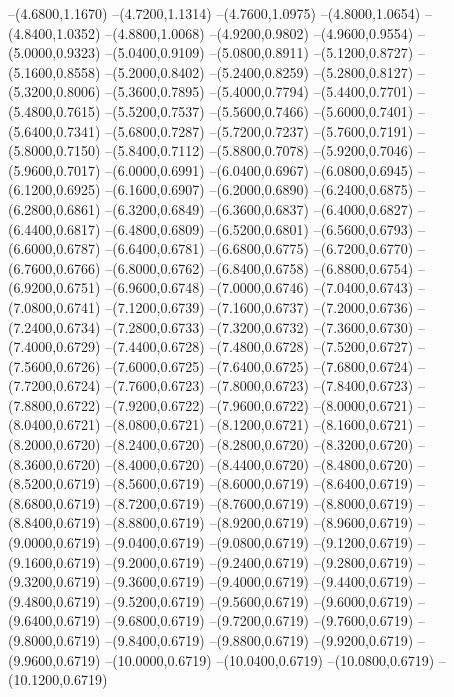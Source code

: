 {	--(4.6800,1.1670)
	--(4.7200,1.1314)
	--(4.7600,1.0975)
	--(4.8000,1.0654)
	--(4.8400,1.0352)
	--(4.8800,1.0068)
	--(4.9200,0.9802)
	--(4.9600,0.9554)
	--(5.0000,0.9323)
	--(5.0400,0.9109)
	--(5.0800,0.8911)
	--(5.1200,0.8727)
	--(5.1600,0.8558)
	--(5.2000,0.8402)
	--(5.2400,0.8259)
	--(5.2800,0.8127)
	--(5.3200,0.8006)
	--(5.3600,0.7895)
	--(5.4000,0.7794)
	--(5.4400,0.7701)
	--(5.4800,0.7615)
	--(5.5200,0.7537)
	--(5.5600,0.7466)
	--(5.6000,0.7401)
	--(5.6400,0.7341)
	--(5.6800,0.7287)
	--(5.7200,0.7237)
	--(5.7600,0.7191)
	--(5.8000,0.7150)
	--(5.8400,0.7112)
	--(5.8800,0.7078)
	--(5.9200,0.7046)
	--(5.9600,0.7017)
	--(6.0000,0.6991)
	--(6.0400,0.6967)
	--(6.0800,0.6945)
	--(6.1200,0.6925)
	--(6.1600,0.6907)
	--(6.2000,0.6890)
	--(6.2400,0.6875)
	--(6.2800,0.6861)
	--(6.3200,0.6849)
	--(6.3600,0.6837)
	--(6.4000,0.6827)
	--(6.4400,0.6817)
	--(6.4800,0.6809)
	--(6.5200,0.6801)
	--(6.5600,0.6793)
	--(6.6000,0.6787)
	--(6.6400,0.6781)
	--(6.6800,0.6775)
	--(6.7200,0.6770)
	--(6.7600,0.6766)
	--(6.8000,0.6762)
	--(6.8400,0.6758)
	--(6.8800,0.6754)
	--(6.9200,0.6751)
	--(6.9600,0.6748)
	--(7.0000,0.6746)
	--(7.0400,0.6743)
	--(7.0800,0.6741)
	--(7.1200,0.6739)
	--(7.1600,0.6737)
	--(7.2000,0.6736)
	--(7.2400,0.6734)
	--(7.2800,0.6733)
	--(7.3200,0.6732)
	--(7.3600,0.6730)
	--(7.4000,0.6729)
	--(7.4400,0.6728)
	--(7.4800,0.6728)
	--(7.5200,0.6727)
	--(7.5600,0.6726)
	--(7.6000,0.6725)
	--(7.6400,0.6725)
	--(7.6800,0.6724)
	--(7.7200,0.6724)
	--(7.7600,0.6723)
	--(7.8000,0.6723)
	--(7.8400,0.6723)
	--(7.8800,0.6722)
	--(7.9200,0.6722)
	--(7.9600,0.6722)
	--(8.0000,0.6721)
	--(8.0400,0.6721)
	--(8.0800,0.6721)
	--(8.1200,0.6721)
	--(8.1600,0.6721)
	--(8.2000,0.6720)
	--(8.2400,0.6720)
	--(8.2800,0.6720)
	--(8.3200,0.6720)
	--(8.3600,0.6720)
	--(8.4000,0.6720)
	--(8.4400,0.6720)
	--(8.4800,0.6720)
	--(8.5200,0.6719)
	--(8.5600,0.6719)
	--(8.6000,0.6719)
	--(8.6400,0.6719)
	--(8.6800,0.6719)
	--(8.7200,0.6719)
	--(8.7600,0.6719)
	--(8.8000,0.6719)
	--(8.8400,0.6719)
	--(8.8800,0.6719)
	--(8.9200,0.6719)
	--(8.9600,0.6719)
	--(9.0000,0.6719)
	--(9.0400,0.6719)
	--(9.0800,0.6719)
	--(9.1200,0.6719)
	--(9.1600,0.6719)
	--(9.2000,0.6719)
	--(9.2400,0.6719)
	--(9.2800,0.6719)
	--(9.3200,0.6719)
	--(9.3600,0.6719)
	--(9.4000,0.6719)
	--(9.4400,0.6719)
	--(9.4800,0.6719)
	--(9.5200,0.6719)
	--(9.5600,0.6719)
	--(9.6000,0.6719)
	--(9.6400,0.6719)
	--(9.6800,0.6719)
	--(9.7200,0.6719)
	--(9.7600,0.6719)
	--(9.8000,0.6719)
	--(9.8400,0.6719)
	--(9.8800,0.6719)
	--(9.9200,0.6719)
	--(9.9600,0.6719)
	--(10.0000,0.6719)
	--(10.0400,0.6719)
	--(10.0800,0.6719)
	--(10.1200,0.6719)
}
